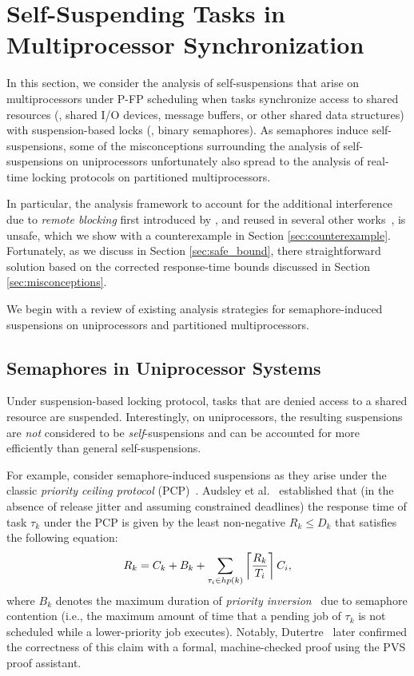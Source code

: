 \section{Self-Suspending Tasks in Multiprocessor Synchronization}
\label{sec:syn}

In this section, we consider the analysis of self-suspensions that arise on multiprocessors under P-FP scheduling when tasks synchronize access to shared resources (\eg, shared I/O devices, message buffers, or other shared data structures) with suspension-based locks (\eg, binary semaphores). As semaphores induce self-suspensions, some of the misconceptions surrounding the analysis of self-suspensions on uniprocessors unfortunately also spread to the analysis of  real-time locking protocols on partitioned multiprocessors.

In particular, the analysis framework to account for the additional interference due to \emph{remote blocking} first introduced by \cite{lakshmanan-2009}, and reused in several other works~\cite{zeng-2011,bbb-2013,yang-2013,kim-2014,han-2014,carminati-2014,yang-2014},  is unsafe, which we show with a counterexample in Section \ref{sec:counterexample}. Fortunately, as we discuss in Section \ref{sec:safe_bound}, there straightforward solution based on the corrected response-time bounds discussed in Section \ref{sec:misconceptions}.

We begin with a review of existing analysis strategies for semaphore-induced suspensions on uniprocessors and partitioned multiprocessors. 
 

\subsection{Semaphores in Uniprocessor Systems}
\label{sec:sem-uni}

Under suspension-based locking protocol, tasks that are denied access to a shared resource are suspended. Interestingly, on uniprocessors, the resulting suspensions are \emph{not} considered to be \emph{self}-suspensions and can be accounted for more efficiently than general self-suspensions.

For example, consider semaphore-induced suspensions as they arise under the classic \emph{priority ceiling protocol} (PCP)~\cite{SRL:90}. Audsley et al.~\cite{audsley-1993} established that (in the absence of release jitter and assuming constrained deadlines) the response time of task $\tau_k$ under the PCP is given by the least non-negative $R_k \leq D_k$ that satisfies the following equation:
\begin{equation}
R_k = C_k+ B_k+\sum_{\tau_i \in hp(k)}\left\lceil{\frac{R_k}{T_i}}\right\rceil C_i,
\label{eq:classic-pcp-rta}
\end{equation}
where $B_k$ denotes the maximum duration of \emph{priority inversion}~\cite{SRL:90} due to semaphore contention (i.e., the maximum amount of time that a pending job of $\tau_k$ is not scheduled while a lower-priority job executes). Notably, Dutertre~\cite{Du:99} later confirmed the correctness of this claim  with a formal, machine-checked proof using the PVS proof assistant. 

